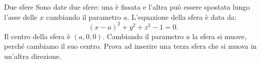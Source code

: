 \begin{surferPage}{Due sfere}
Sono date due sfere: una \`e fissata e l'altra pu\`o essere spostata lungo l'asse delle $x$ cambiando il parametro $a$.
L'equazione della sfera \`e data da:
\[(x-a)^2+y^2+z^2-1=0.\]
Il centro della sfera \`e $(a,0,0)$. Cambiando il parametro $a$ la sfera si muove, perch\'e cambiamo  il suo centro.
Prova ad inserire una terza sfera che si muova in un'altra direzione.
\end{surferPage}



